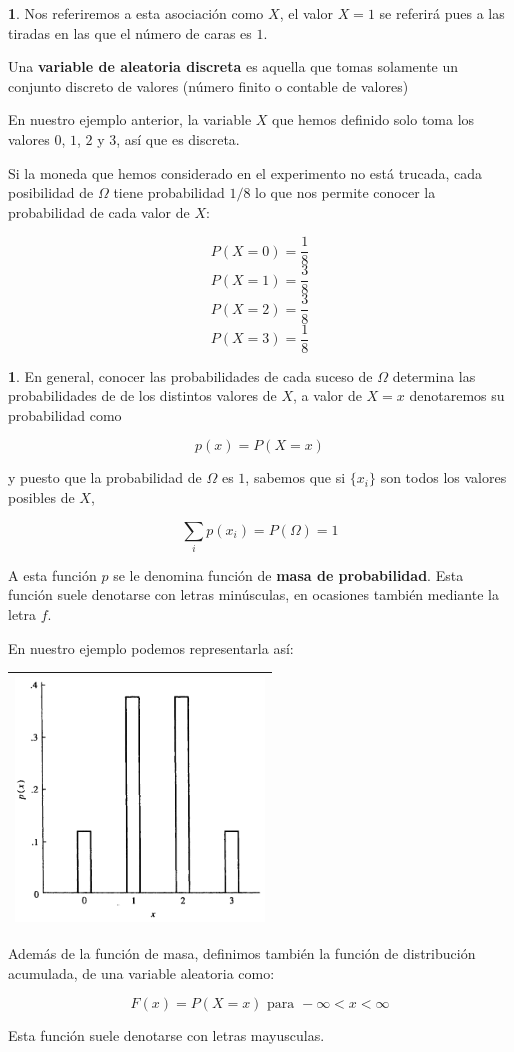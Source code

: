 \documentclass[]{book}
\theoremstyle{plain}
\theoremstyle{definition}
\theoremstyle{definition} %
\newcommand{\thistheoremname}{}
\newtheorem{genericthm}[theorem]{\thistheoremname}
\newenvironment{customdef}[1]
  {\renewcommand{\thistheoremname}{#1}%
   \begin{genericthm}}
  {\end{genericthm}}
\begin{document}
\begin{customdef}{Definición intuitiva de variable aleatoria}
Nos referiremos a esta asociación como \(X\), el valor \(X=1\) se
referirá pues a las tiradas en las que el número de caras es \(1\).

Una \textbf{variable de aleatoria discreta} es aquella que tomas
solamente un conjunto discreto de valores (número finito o contable de
valores)

En nuestro ejemplo anterior, la variable \(X\) que hemos definido solo
toma los valores \(0\), \(1\), \(2\) y \(3\), así que es discreta.

Si la moneda que hemos considerado en el experimento no está trucada,
cada posibilidad de \(\Omega\) tiene probabilidad \(1/8\) lo que nos
permite conocer la probabilidad de cada valor de \(X\):

\[P(X = 0) = \frac{1}{8}\] \[P(X = 1) = \frac{3}{8}\]
\[P(X = 2) = \frac{3}{8}\] \[P(X = 3) = \frac{1}{8}\]
\end{customdef}

\begin{customdef}{Función de masa de probabilidad}
  
En general, conocer las probabilidades de cada suceso de \(\Omega\)
determina las probabilidades de de los distintos valores de \(X\), a
valor de \(X=x\) denotaremos su probabilidad como

\[p(x) = P(X=x)\]

y puesto que la probabilidad de \(\Omega\) es \(1\), sabemos que si
\(\{x_i\}\) son todos los valores posibles de \(X\),

\[\sum_{i} p(x_i) = P(\Omega) = 1\]

A esta función \(p\) se le denomina función de \textbf{masa de
probabilidad}. Esta función suele denotarse con letras minúsculas, en
ocasiones también mediante la letra \(f\).

En nuestro ejemplo podemos representarla así:

\begin{longtable}[]{@{}l@{}}
\toprule
\endhead
\includegraphics[width=2.60417in,height=\textheight]{img/funcion_masa_discreta.png}\tabularnewline
\bottomrule
\end{longtable}

Además de la función de masa, definimos también la función de
distribución acumulada, de una variable aleatoria como:

\[ F(x) = P(X=x) \text{ para } -\infty < x < \infty\]

Esta función suele denotarse con letras mayusculas.
\end{customdef}
\end{document}
